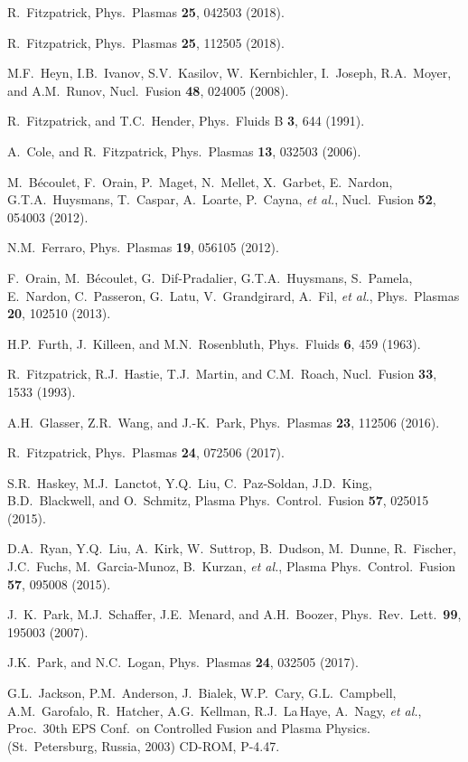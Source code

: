 \documentclass[12pt,prb,aps]{revtex4-1}
\begin{document}
\begin{thebibliography}{99}
 R.~Fitzpatrick, Phys.\ Plasmas {\bf 25}, 042503 (2018).

 R.~Fitzpatrick, Phys.\ Plasmas {\bf 25}, 112505 (2018).

 M.F.~Heyn, I.B.~Ivanov, S.V.~Kasilov, W.~Kernbichler, I.~Joseph, R.A.~Moyer,  and A.M.~Runov, Nucl.\ Fusion {\bf 48}, 024005 (2008). 

 R.~Fitzpatrick, and T.C.~Hender, Phys.\ Fluids B {\bf 3}, 644 (1991).

 A.~Cole, and R.~Fitzpatrick, Phys.\ Plasmas {\bf 13}, 032503 (2006).

 M.~B\'{e}coulet, F.~Orain, P.~Maget, N.~Mellet, X.~Garbet, E.~Nardon, G.T.A.~Huysmans, T.~Caspar, A.~Loarte,  P.~Cayna, {\em et al.}, 
Nucl.\ Fusion {\bf 52}, 054003  (2012).

 N.M.~Ferraro, Phys.\ Plasmas {\bf 19}, 056105  (2012).

 F.~Orain, M.~B\'{e}coulet, G.~Dif-Pradalier, G.T.A.~Huysmans, S.~Pamela,   E.~Nardon, C.~Passeron, G.~Latu, V.~Grandgirard, A.~Fil, {\em et al.}, 
Phys.\ Plasmas {\bf 20}, 102510 (2013). 

 H.P.~Furth,  J.~Killeen, and M.N.~Rosenbluth,  Phys.\ Fluids {\bf 6}, 459 (1963).

 R.~Fitzpatrick, R.J.~Hastie, T.J.~Martin, and C.M.~Roach, Nucl.\ Fusion {\bf 33}, 1533 (1993).

 A.H.~Glasser, Z.R.~Wang, and J.-K.~Park, Phys.\ Plasmas {\bf 23}, 112506 (2016).

 R.~Fitzpatrick, Phys.\ Plasmas {\bf 24}, 072506 (2017). 

 S.R.~Haskey, M.J.~Lanctot, Y.Q.~Liu, C.~Paz-Soldan, J.D.~King, B.D.~Blackwell, and O.~Schmitz,  Plasma 
Phys.\ Control.\ Fusion {\bf 57}, 025015 (2015).

 D.A.~Ryan,  Y.Q.~Liu, A.~Kirk, W.~Suttrop, B.~Dudson, M.~Dunne, R.~Fischer, J.C.~Fuchs, M.~Garcia-Munoz, B.~Kurzan, {\it et al.}, 
Plasma Phys.\ Control.\ Fusion {\bf 57}, 095008 (2015).

 J.~K.~Park, M.J.~Schaffer, J.E.~Menard, and A.H.~Boozer, Phys.\ Rev.\ Lett.\ {\bf 99}, 195003 (2007).

 J.K.~Park, and N.C.~Logan, Phys.\ Plasmas {\bf 24}, 032505 (2017).

 G.L.~Jackson, P.M.~Anderson, J.~Bialek, W.P.~Cary, G.L.~Campbell, A.M.~Garofalo,  R.~Hatcher, A.G.~Kellman, R.J.~La\,Haye, A.~Nagy, {\em et al.},  
Proc.\ 30th EPS Conf.\ on Controlled Fusion and Plasma Physics. (St.\ Petersburg, Russia, 2003) CD-ROM, P-4.47.


\end{thebibliography}
\end{document}
